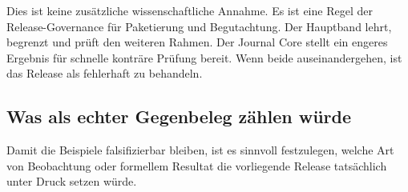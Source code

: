 Dies ist keine zusätzliche wissenschaftliche Annahme. Es ist eine Regel der Release-Governance für Paketierung
und Begutachtung. Der Hauptband lehrt, begrenzt und prüft den weiteren Rahmen. Der Journal Core stellt ein
engeres Ergebnis für schnelle konträre Prüfung bereit. Wenn beide auseinandergehen, ist das Release als
fehlerhaft zu behandeln.

\subsection{Was als echter Gegenbeleg zählen würde}

Damit die Beispiele falsifizierbar bleiben, ist es sinnvoll festzulegen, welche Art von Beobachtung oder
formellem Resultat die vorliegende Release tatsächlich unter Druck setzen würde.

